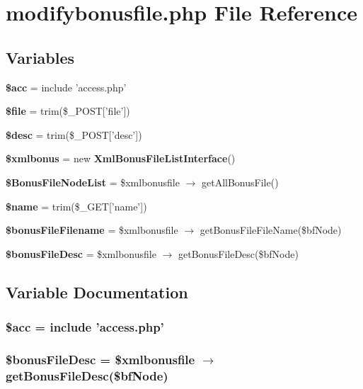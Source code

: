 \section{modifybonusfile.php File Reference}
\label{modifybonusfile_8php}


\subsection*{Variables}
\begin{CompactItemize}
\item 
{\bf \$acc} = include 'access.php'
\item 
{\bf \$file} = trim(\$\_\-POST['file'])
\item 
{\bf \$desc} = trim(\$\_\-POST['desc'])
\item 
{\bf \$xmlbonus} = new {\bf Xml\-Bonus\-File\-List\-Interface}()
\item 
{\bf \$Bonus\-File\-Node\-List} = \$xmlbonusfile $\rightarrow$ get\-All\-Bonus\-File()
\item 
{\bf \$name} = trim(\$\_\-GET['name'])
\item 
{\bf \$bonus\-File\-Filename} = \$xmlbonusfile $\rightarrow$ get\-Bonus\-File\-File\-Name(\$bf\-Node)
\item 
{\bf \$bonus\-File\-Desc} = \$xmlbonusfile $\rightarrow$ get\-Bonus\-File\-Desc(\$bf\-Node)
\end{CompactItemize}


\subsection{Variable Documentation}
\subsubsection{\setlength{\rightskip}{0pt plus 5cm}\$acc = include 'access.php'}\label{modifybonusfile_8php_542926c588a05eb69553d79c83cf73da}


\subsubsection{\setlength{\rightskip}{0pt plus 5cm}\$bonus\-File\-Desc = \$xmlbonusfile $\rightarrow$ get\-Bonus\-File\-Desc(\$bf\-Node)}\label{modifybonusfile_8php_9ed07d0ad4c0f35b6978c428b4cffe0e}


